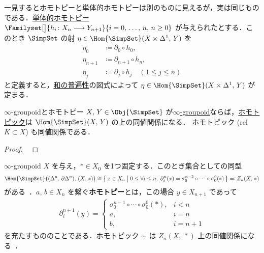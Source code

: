 \documentclass[TQFT_main]{subfiles}
\begin{document}
一見するとホモトピーと単体的ホモトピーは別のものに見えるが，実は同じものである．\hyperref[def:SimpSet-homotopy]{単体的ホモトピー} $\Familyset[\big]{h_i \colon X_n \lto Y_{n+1}}{i = 0,\, \dots,\, n,\, n \ge 0}$ が与えられたとする．このとき $\SimpSet$ の射 $\eta \in \Hom{\SimpSet}(X \times \Delta^1,\, Y)$ を
\begin{align}
    \eta_0 &\coloneqq \partial_0 \circ h_0, \\
    \eta_{n+1} &\coloneqq \partial_{n+1} \circ h_n, \\
    \eta_j &\coloneqq \partial_j \circ h_{j} \quad (1\le j \le n)
\end{align}
と定義すると，\hyperref[def:colim]{和の普遍性}の図式によって $\eta \in \Hom{\SimpSet}(X \times \Delta^1,\, Y)$ が定まる．

\begin{myprop}[label=prop:simphomotopy-equiv]{$\infty$-groupoidとホモトピー}
    $X,\, Y \in \Obj{\SimpSet}$ が\hyperref[def:infinity-1]{$\infty$-groupoid}ならば，\hyperref[def:SimpSet-homotopic]{ホモトピック}は $\Hom{\SimpSet} (X,\, Y)$ の上の同値関係になる．
    ホモトピック (rel $K \subset X$) も同値関係である．
\end{myprop}

\begin{proof}
    ~\cite[p.26, COROLLARY 6.2]{goerss2009simplicial}
\end{proof}

$\infty$-groupoid $X$ を与え，$* \in X_0$ を1つ固定する．このとき集合としての同型
\begin{align}
    \Hom{\SimpSet} \bigl( (\Delta^n,\, \partial\Delta^n),\, (X,\, *) \bigr) \cong \bigl\{\, x \in X_n \bigm|  0 \le \forall i \le n,\; \partial^n_i(x) = \sigma^{n-2}_0 \circ \cdots \circ \sigma^0_0 (*) \,\bigr\} \eqqcolon Z_n (X,\, *)
\end{align}
がある~\cite{SChen2024anomaly}．$a,\, b \in X_n$ を繋ぐ\textbf{ホモトピー}とは，この場合 $y \in X_{n+1}$ であって
\begin{align}
    \partial_i^{n+1} (y) =
    \begin{cases}
        \sigma^{n-1}_0 \circ \cdots \circ \sigma^0_0 (*), &i < n \\
        a, &i=n \\
        b, &i=n+1
    \end{cases}    
\end{align}
を充たすもののことである．ホモトピック $\sim$ は $Z_n(X,\, *)$ 上の同値関係になる~\cite[p.27, Lemma 3.28]{SChen2024anomaly}．
\end{document}
